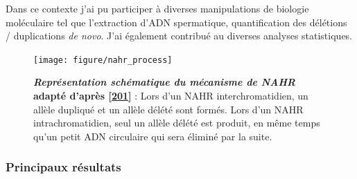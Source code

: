 \documentclass[12pt,a4paper,twoside]{ugathesis}
\theoremstyle{definition}
\theoremstyle{definition}
\theoremstyle{definition}
\theoremstyle{remark}
\begin{document}
Dans ce contexte j'ai pu participer à diverses manipulations de biologie
moléculaire tel que l'extraction d'ADN spermatique, quantification des
délétions / duplications \emph{de novo}. J'ai également contribué au
diverses analyses statistiques.

\newpage 

\begin{figure}

{\centering \texttt{[image: figure/nahr\_process]} 

}

\caption[Représentation schématique du mécanisme de NAHR]{\textbf{\emph{Représentation schématique du mécanisme de
NAHR} adapté d'après {[}\protect\hyperlink{ref-Liu2012}{201}{]}} : Lors
d'un NAHR interchromatidien, un allèle dupliqué et un allèle délété sont
formés. Lors d'un NAHR intrachromatidien, seul un allèle délété est
produit, en même temps qu'un petit ADN circulaire qui sera éliminé par
la suite.}\label{fig:pictnahr}
\end{figure}








\newpage



\newpage

\subsubsection{Principaux résultats}\label{principaux-resultats-5}
\end{document}
